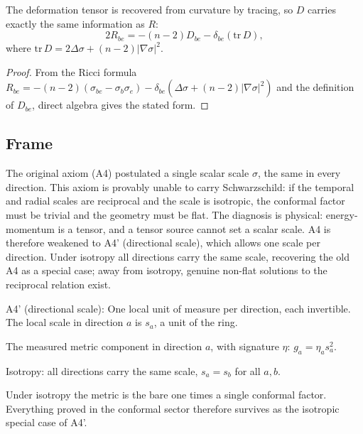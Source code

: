 \begin{theorem}
The deformation tensor is recovered from curvature by tracing, so $D$ carries exactly the same information as $R$:
$$2R_{be} = -(n-2)D_{be} - \delta_{be}(\text{tr}\,D),$$
where $\text{tr}\,D = 2\Delta\sigma + (n-2)|\nabla\sigma|^2$. 
\end{theorem}

\begin{proof}
From the Ricci formula $R_{be} = -(n-2)(\sigma_{be} - \sigma_b\sigma_e) - \delta_{be}(\Delta\sigma + (n-2)|\nabla\sigma|^2)$ and the definition of $D_{be}$, direct algebra gives the stated form.
\end{proof}

\subsection{Frame}

The original axiom (A4) postulated a single scalar scale $\sigma$, the same in every direction. This axiom is provably unable to carry Schwarzschild: if the temporal and radial scales are reciprocal and the scale is isotropic, the conformal factor must be trivial and the geometry must be flat. The diagnosis is physical: energy-momentum is a tensor, and a tensor source cannot set a scalar scale. A4 is therefore weakened to A4' (directional scale), which allows one scale per direction. Under isotropy all directions carry the same scale, recovering the old A4 as a special case; away from isotropy, genuine non-flat solutions to the reciprocal relation exist.

\begin{definition}
A4' (directional scale): One local unit of measure per direction, each invertible. The local scale in direction $a$ is $s_a$, a unit of the ring. 
\end{definition}

\begin{definition}
The measured metric component in direction $a$, with signature $\eta$: $g_a = \eta_a s_a^2$. 
\end{definition}

\begin{definition}
Isotropy: all directions carry the same scale, $s_a = s_b$ for all $a,b$. 
\end{definition}

\begin{theorem}
Under isotropy the metric is the bare one times a single conformal factor. Everything proved in the conformal sector therefore survives as the isotropic special case of A4'. 
\end{theorem}

